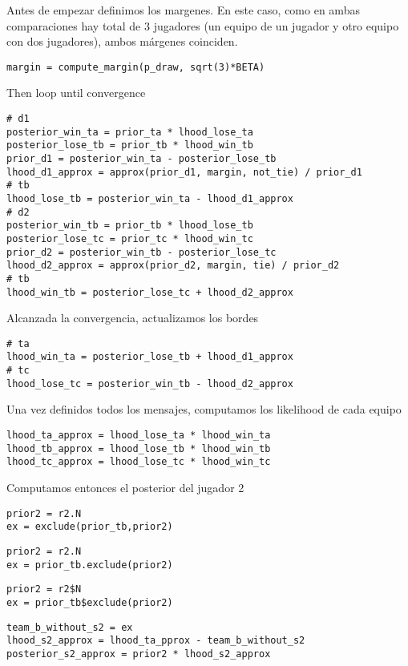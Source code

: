 \documentclass[article]{jss}
\begin{document}
%
Antes de empezar definimos los margenes.
%
En este caso, como en ambas comparaciones hay total de 3 jugadores (un equipo de un jugador y otro equipo con dos jugadores), ambos márgenes coinciden.
%
\begin{lstlisting}[backgroundcolor=\color{all}]
margin = compute_margin(p_draw, sqrt(3)*BETA)
\end{lstlisting}
%
Then loop until convergence
%
\begin{lstlisting}[backgroundcolor=\color{all}]
# d1
posterior_win_ta = prior_ta * lhood_lose_ta 
posterior_lose_tb = prior_tb * lhood_win_tb
prior_d1 = posterior_win_ta - posterior_lose_tb
lhood_d1_approx = approx(prior_d1, margin, not_tie) / prior_d1 
# tb
lhood_lose_tb = posterior_win_ta - lhood_d1_approx
# d2
posterior_win_tb = prior_tb * lhood_lose_tb
posterior_lose_tc = prior_tc * lhood_win_tc 
prior_d2 = posterior_win_tb - posterior_lose_tc
lhood_d2_approx = approx(prior_d2, margin, tie) / prior_d2 
# tb
lhood_win_tb = posterior_lose_tc + lhood_d2_approx
\end{lstlisting}
%
Alcanzada la convergencia, actualizamos los bordes
%
\begin{lstlisting}[backgroundcolor=\color{all}]
# ta
lhood_win_ta = posterior_lose_tb + lhood_d1_approx
# tc
lhood_lose_tc = posterior_win_tb - lhood_d2_approx
\end{lstlisting}
%
Una vez definidos todos los mensajes, computamos los likelihood de cada equipo
\begin{lstlisting}[backgroundcolor=\color{all}]
lhood_ta_approx = lhood_lose_ta * lhood_win_ta 
lhood_tb_approx = lhood_lose_tb * lhood_win_tb
lhood_tc_approx = lhood_lose_tc * lhood_win_tc
\end{lstlisting}
Computamos entonces el posterior del jugador 2
\begin{paracol}{3}
\begin{lstlisting}[backgroundcolor=\color{julia},belowskip=-0.77 \baselineskip]
prior2 = r2.N
ex = exclude(prior_tb,prior2)
\end{lstlisting}
\switchcolumn
\begin{lstlisting}[backgroundcolor=\color{python},belowskip=-0.77 \baselineskip]
prior2 = r2.N
ex = prior_tb.exclude(prior2)
\end{lstlisting}
\switchcolumn
\begin{lstlisting}[backgroundcolor=\color{r},belowskip=-0.77 \baselineskip]
prior2 = r2$N
ex = prior_tb$exclude(prior2)
\end{lstlisting}
\end{paracol}
\begin{lstlisting}[backgroundcolor=\color{all}]
team_b_without_s2 = ex
lhood_s2_approx = lhood_ta_pprox - team_b_without_s2 
posterior_s2_approx = prior2 * lhood_s2_approx 
\end{lstlisting}
\end{document}
